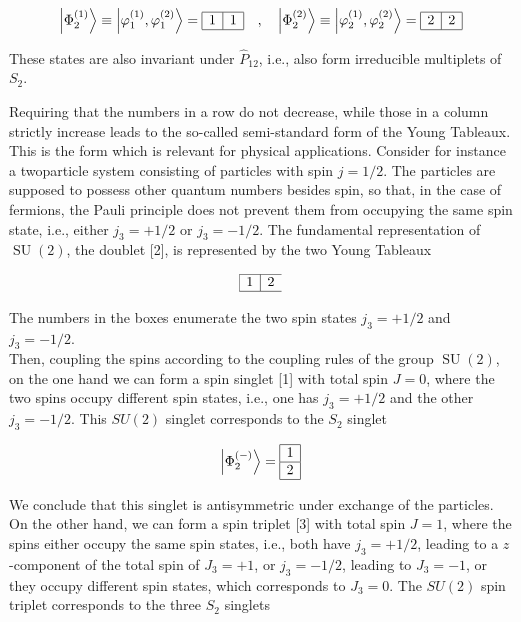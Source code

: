 \documentclass[10pt, letterpaper]{article}
\begin{document}
$$
\left|\Phi_{2}^{(1)}\right\rangle \equiv\left|\varphi_{1}^{(1)}, \varphi_{1}^{(2)}\right\rangle=\begin{array}{|l|l|}
\hline 1 & 1 \\
\hline
\end{array} \quad, \quad\left|\Phi_{2}^{(2)}\right\rangle \equiv\left|\varphi_{2}^{(1)}, \varphi_{2}^{(2)}\right\rangle=\begin{array}{|l|l|}
\hline 2 & 2 \\
\hline
\end{array}
$$

These states are also invariant under $\hat{P}_{12}$, i.e., also form irreducible multiplets of $S_{2}$.

Requiring that the numbers in a row do not decrease, while those in a column strictly increase leads to the so-called semi-standard form of the Young Tableaux. This is the form which is relevant for physical applications. Consider for instance a twoparticle system consisting of particles with spin $j=1 / 2$. The particles are supposed to possess other quantum numbers besides spin, so that, in the case of fermions, the Pauli principle does not prevent them from occupying the same spin state, i.e., either $j_{3}=+1 / 2$ or $j_{3}=-1 / 2$. The fundamental representation of $\operatorname{SU}(2)$, the doublet [2], is represented by the two Young Tableaux

$$
\begin{array}{|l|l}
\hline 1 & 2 \\
\hline
\end{array}
$$

The numbers in the boxes enumerate the two spin states $j_{3}=+1 / 2$ and $j_{3}=-1 / 2$.\\
Then, coupling the spins according to the coupling rules of the group $\operatorname{SU}(2)$, on the one hand we can form a spin singlet [1] with total spin $J=0$, where the two spins occupy different spin states, i.e., one has $j_{3}=+1 / 2$ and the other $j_{3}=-1 / 2$. This $S U(2)$ singlet corresponds to the $S_{2}$ singlet

$$
\left|\Phi_{2}^{(-)}\right\rangle=\begin{array}{|l|}
\hline 1 \\
\hline 2 \\
\hline
\end{array}
$$

We conclude that this singlet is antisymmetric under exchange of the particles.\\[0pt]
On the other hand, we can form a spin triplet [3] with total spin $J=1$, where the spins either occupy the same spin states, i.e., both have $j_{3}=+1 / 2$, leading to a $z$-component of the total spin of $J_{3}=+1$, or $j_{3}=-1 / 2$, leading to $J_{3}=-1$, or they occupy different spin states, which corresponds to $J_{3}=0$. The $S U(2)$ spin triplet corresponds to the three $S_{2}$ singlets
\end{document}
